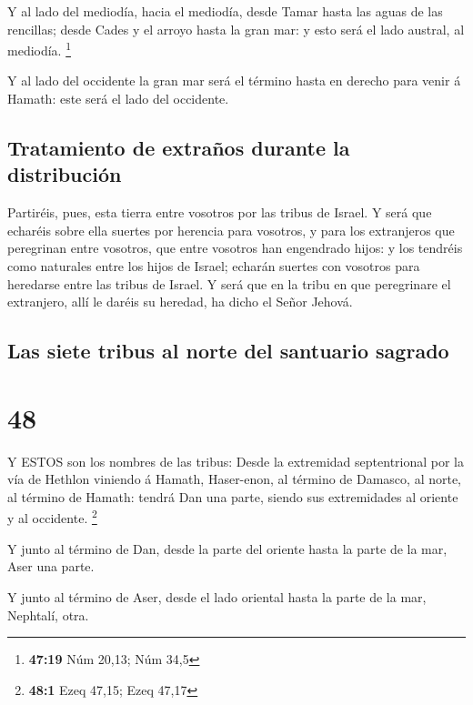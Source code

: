 Y al lado del mediodía, hacia el mediodía, desde Tamar
hasta las aguas de las rencillas; desde Cades y el arroyo hasta la gran
mar: y esto será el lado austral, al mediodía. \footnote{\textbf{47:19}
  Núm 20,13; Núm 34,5}

 Y al lado del occidente la gran mar será el término hasta
en derecho para venir á Hamath: este será el lado del occidente.

\hypertarget{tratamiento-de-extrauxf1os-durante-la-distribuciuxf3n}{%
\subsection{Tratamiento de extraños durante la
distribución}\label{tratamiento-de-extrauxf1os-durante-la-distribuciuxf3n}}

 Partiréis, pues, esta tierra entre vosotros por las tribus
de Israel.  Y será que echaréis sobre ella suertes por
herencia para vosotros, y para los extranjeros que peregrinan entre
vosotros, que entre vosotros han engendrado hijos: y los tendréis como
naturales entre los hijos de Israel; echarán suertes con vosotros para
heredarse entre las tribus de Israel.  Y será que en la
tribu en que peregrinare el extranjero, allí le daréis su heredad, ha
dicho el Señor Jehová.

\hypertarget{las-siete-tribus-al-norte-del-santuario-sagrado}{%
\subsection{Las siete tribus al norte del santuario
sagrado}\label{las-siete-tribus-al-norte-del-santuario-sagrado}}

\hypertarget{section-47}{%
\section{48}\label{section-47}}

 Y ESTOS son los nombres de las tribus: Desde la extremidad
septentrional por la vía de Hethlon viniendo á Hamath, Haser-enon, al
término de Damasco, al norte, al término de Hamath: tendrá Dan una
parte, siendo sus extremidades al oriente y al occidente. \footnote{\textbf{48:1}
  Ezeq 47,15; Ezeq 47,17}

 Y junto al término de Dan, desde la parte del oriente hasta
la parte de la mar, Aser una parte.

 Y junto al término de Aser, desde el lado oriental hasta la
parte de la mar, Nephtalí, otra.

